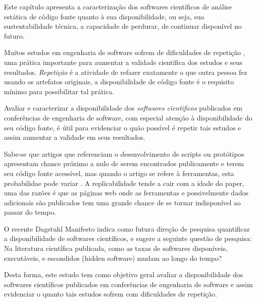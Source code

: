 {Este capítulo apresenta a caracterização dos softwares científicos de análise
estática de código fonte quanto à sua disponibilidade, ou seja, sua
sustentabilidade técnica, a capacidade de perdurar, de continuar
disponível no futuro.}
\label{caracterizacao-ferramentas}



Muitos estudos em engenharia de software sofrem de dificuldades de repetição
\cite{Tang2016}, uma prática importante para aumentar a validade científica dos
estudos e seus resultados. {\it Repetição} é a atividade de refazer exatamente
o que outra pessoa fez usando os artefatos originais, a disponibilidade de
código fonte é o requisito mínimo para possibilitar tal prática.

Avaliar e caracterizar a disponibilidade dos {\it softwares cientificos}
publicados em conferências de engenharia de software, com especial atenção à
disponibilidade do seu código fonte, é útil para evidenciar o quão possível é
repetir tais estudos e assim aumentar a validade em seus resultados.

Sabe-se que artigos que referenciam o desenvolvimento de scripts ou protótipos
apresentam chance próximo a nulo de serem encontrados publicamente e terem seu
código fonte acessível, mas quando o artigo se refere à ferramentas, esta
probabilidae pode variar \cite{robles2010replicating}. A replicabilidade tende
a cair com a idade do paper, uma das razões é que as páginas web onde as
ferramentas e possivelmente dados adicionais são publicados tem uma grande
chance de se tornar indisponível ao passar do tempo.

O recente Dagstuhl Manifesto \cite{allen2017engineering} indica como
futura direção de pesquisa quantificar a disponibilidade
de softwares científicos, e sugere a seguinte questão de pesquisa:
Na literatura científica publicada, como as taxas de softwares disponíveis,
executáveis, e escondidos (hidden software) mudam ao longo do tempo?

Desta forma, este estudo tem como objetivo geral avaliar a disponibilidade dos
softwares científicos publicados em conferências de engenharia de software e
assim evidenciar o quanto tais estudos sofrem com dificuldades de repetição.

